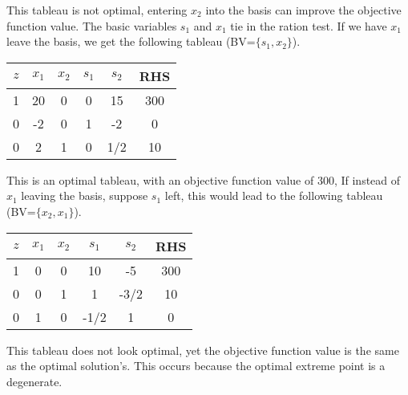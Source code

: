 This tableau is not optimal, entering $x_2$ into the basis can improve the objective function value. The basic variables $s_1$ and $x_1$ tie in the ration test.  If we have $x_1$ leave the basis, we get the following tableau (BV=$\{s_1, x_2\}$).
\begin{center} \begin{tabular} {|c|c|c|c|c||c|}
\hline
$z$ & $x_1$ & $x_2$ & $s_1$ & $s_2$ & RHS \\
\hline
  1 &    20 &     0 &     0 &    15 & 300 \\
  0 &    -2 &     0 &     1 &    -2 &  0 \\
  0 &     2 &     1 &     0 &   1/2 &  10 \\ \hline
\end{tabular} \end{center}
This is an optimal tableau, with an objective function value of 300,  If instead of $x_1$ leaving the basis, suppose $s_1$ left, this would lead to the following tableau (BV=$\{x_2, x_1\}$).
\begin{center} \begin{tabular} {|c|c|c|c|c||c|} \hline
$z$ & $x_1$ & $x_2$ & $s_1$ & $s_2$ & RHS \\
\hline
  1 &     0 &     0 &    10 &    -5 & 300 \\
  0 &     0 &     1 &     1 &  -3/2 &  10 \\
  0 &     1 &     0 &  -1/2 &     1 &   0 \\ \hline
\end{tabular} \end{center}
This tableau does not look optimal, yet the objective function value is the same as the optimal solution's. This occurs because the optimal extreme point is a degenerate.%

